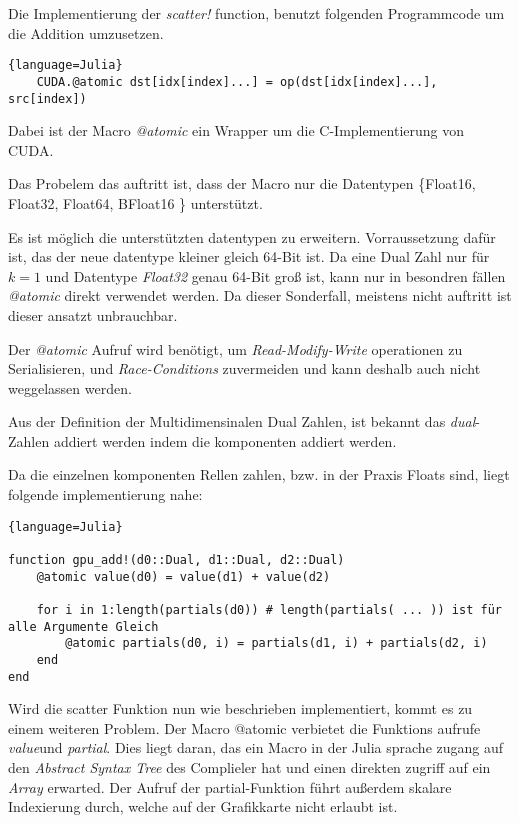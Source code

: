 Die Implementierung der \textit{scatter!} function, benutzt folgenden Programmcode um die 
Addition umzusetzen. 

\begin{lstlisting}{language=Julia}
	CUDA.@atomic dst[idx[index]...] = op(dst[idx[index]...], src[index])
\end{lstlisting}


Dabei ist der Macro \textit{@atomic} ein Wrapper um die C-Implementierung von CUDA.

Das Probelem das auftritt ist, dass der Macro nur die Datentypen \{Float16, Float32, Float64, BFloat16 \}
unterstützt.

Es ist möglich die unterstützten datentypen zu erweitern. 
Vorraussetzung dafür ist, das der neue datentype kleiner gleich 64-Bit ist.
Da eine Dual Zahl nur für $k = 1$ und Datentype \textit{Float32} genau 64-Bit groß ist,
kann nur in besondren fällen \textit{@atomic} direkt verwendet werden.
Da dieser Sonderfall, meistens nicht auftritt ist dieser ansatzt unbrauchbar.

Der \textit{@atomic} Aufruf wird benötigt, 
um \textit{Read-Modify-Write} operationen zu Serialisieren, 
und \textit{Race-Conditions} zuvermeiden und kann deshalb auch nicht weggelassen werden.

Aus der Definition der Multidimensinalen Dual Zahlen, ist bekannt das \textit{dual}-Zahlen addiert werden 
indem die komponenten addiert werden.

Da die einzelnen komponenten Rellen zahlen, 
bzw. in der Praxis Floats sind, liegt folgende implementierung nahe:

\begin{lstlisting}{language=Julia}

function gpu_add!(d0::Dual, d1::Dual, d2::Dual)
	@atomic value(d0) = value(d1) + value(d2)
	
	for i in 1:length(partials(d0)) # length(partials( ... )) ist für alle Argumente Gleich
		@atomic partials(d0, i) = partials(d1, i) + partials(d2, i)
	end
end

\end{lstlisting}

Wird die scatter Funktion nun wie beschrieben implementiert, kommt es zu einem weiteren Problem.
Der Macro @atomic verbietet die Funktions aufrufe \textit{value}und \textit{partial}.
Dies liegt daran, das ein Macro in der Julia sprache zugang auf den \textit{Abstract Syntax Tree} des Complieler hat
und einen direkten zugriff auf ein \textit{Array} erwarted.
Der Aufruf der partial-Funktion führt außerdem skalare Indexierung durch, welche auf der Grafikkarte nicht erlaubt ist.



